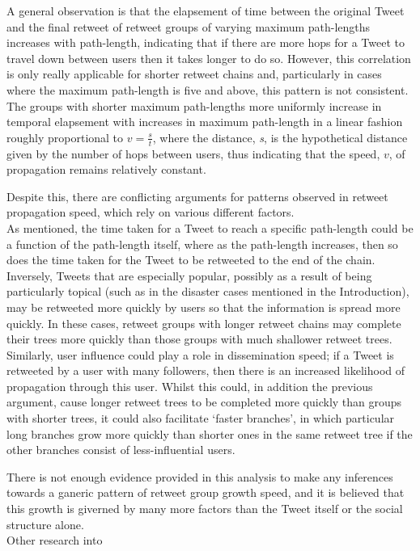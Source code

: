 A general observation is that the elapsement of time between the original Tweet and the final retweet of retweet groups of varying maximum path-lengths increases with path-length, indicating that if there are more hops for a Tweet to travel down between users then it takes longer to do so. However, this correlation is only really applicable for shorter retweet chains and, particularly in cases where the maximum path-length is five and above, this pattern is not consistent.\\
The groups with shorter maximum path-lengths more uniformly increase in temporal elapsement with increases in maximum path-length in a linear fashion roughly proportional to $ v=\frac{s}{t} $, where the distance, \textit{s}, is the hypothetical distance given by the number of hops between users, thus indicating that the speed, $v$, of propagation remains relatively constant. 

Despite this, there are conflicting arguments for patterns observed in retweet propagation speed, which rely on various different factors.\\
As mentioned, the time taken for a Tweet to reach a specific path-length could be a function of the path-length itself, where as the path-length increases, then so does the time taken for the Tweet to be retweeted to the end of the chain.\\
Inversely, Tweets that are especially popular, possibly as a result of being particularly topical (such as in the disaster cases mentioned in the Introduction), may be retweeted more quickly by users so that the information is spread more quickly. In these cases, retweet groups with longer retweet chains may complete their trees more quickly than those groups with much shallower retweet trees.\\
Similarly, user influence could play a role in dissemination speed; if a Tweet is retweeted by a user with many followers, then there is an increased likelihood of propagation through this user. Whilst this could, in addition the previous argument, cause longer retweet trees to be completed more quickly than groups with shorter trees, it could also facilitate `faster branches', in which particular long branches grow more quickly than shorter ones in the same retweet tree if the other branches consist of less-influential users.

There is not enough evidence provided in this analysis to make any inferences towards a ganeric pattern of retweet group growth speed, and it is believed that this growth is giverned by many more factors than the Tweet itself or the social structure alone.\\
Other research into 


